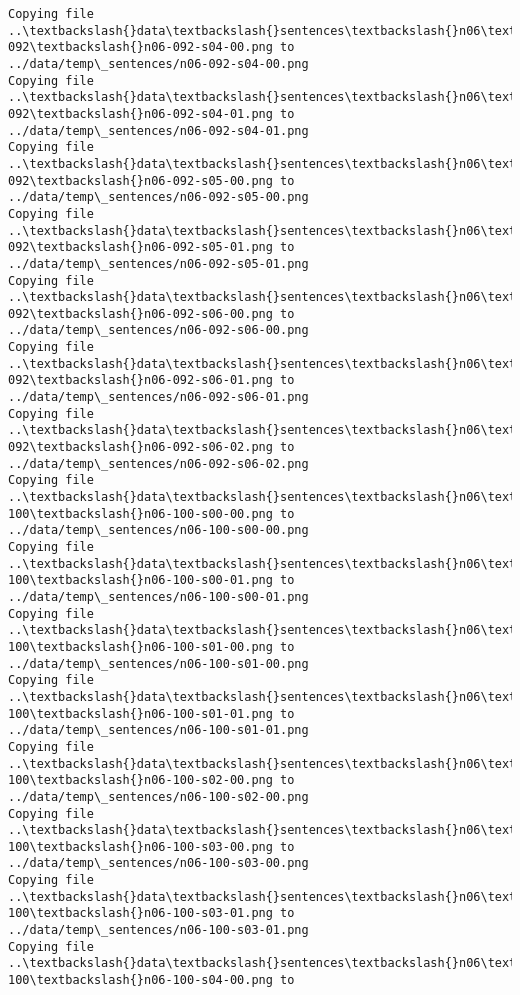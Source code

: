 \documentclass[11pt]{article}
\begin{document}
\begin{Verbatim}[commandchars=\\\{\}]
Copying file ..\textbackslash{}data\textbackslash{}sentences\textbackslash{}n06\textbackslash{}n06-092\textbackslash{}n06-092-s04-00.png to
../data/temp\_sentences/n06-092-s04-00.png
Copying file ..\textbackslash{}data\textbackslash{}sentences\textbackslash{}n06\textbackslash{}n06-092\textbackslash{}n06-092-s04-01.png to
../data/temp\_sentences/n06-092-s04-01.png
Copying file ..\textbackslash{}data\textbackslash{}sentences\textbackslash{}n06\textbackslash{}n06-092\textbackslash{}n06-092-s05-00.png to
../data/temp\_sentences/n06-092-s05-00.png
Copying file ..\textbackslash{}data\textbackslash{}sentences\textbackslash{}n06\textbackslash{}n06-092\textbackslash{}n06-092-s05-01.png to
../data/temp\_sentences/n06-092-s05-01.png
Copying file ..\textbackslash{}data\textbackslash{}sentences\textbackslash{}n06\textbackslash{}n06-092\textbackslash{}n06-092-s06-00.png to
../data/temp\_sentences/n06-092-s06-00.png
Copying file ..\textbackslash{}data\textbackslash{}sentences\textbackslash{}n06\textbackslash{}n06-092\textbackslash{}n06-092-s06-01.png to
../data/temp\_sentences/n06-092-s06-01.png
Copying file ..\textbackslash{}data\textbackslash{}sentences\textbackslash{}n06\textbackslash{}n06-092\textbackslash{}n06-092-s06-02.png to
../data/temp\_sentences/n06-092-s06-02.png
Copying file ..\textbackslash{}data\textbackslash{}sentences\textbackslash{}n06\textbackslash{}n06-100\textbackslash{}n06-100-s00-00.png to
../data/temp\_sentences/n06-100-s00-00.png
Copying file ..\textbackslash{}data\textbackslash{}sentences\textbackslash{}n06\textbackslash{}n06-100\textbackslash{}n06-100-s00-01.png to
../data/temp\_sentences/n06-100-s00-01.png
Copying file ..\textbackslash{}data\textbackslash{}sentences\textbackslash{}n06\textbackslash{}n06-100\textbackslash{}n06-100-s01-00.png to
../data/temp\_sentences/n06-100-s01-00.png
Copying file ..\textbackslash{}data\textbackslash{}sentences\textbackslash{}n06\textbackslash{}n06-100\textbackslash{}n06-100-s01-01.png to
../data/temp\_sentences/n06-100-s01-01.png
Copying file ..\textbackslash{}data\textbackslash{}sentences\textbackslash{}n06\textbackslash{}n06-100\textbackslash{}n06-100-s02-00.png to
../data/temp\_sentences/n06-100-s02-00.png
Copying file ..\textbackslash{}data\textbackslash{}sentences\textbackslash{}n06\textbackslash{}n06-100\textbackslash{}n06-100-s03-00.png to
../data/temp\_sentences/n06-100-s03-00.png
Copying file ..\textbackslash{}data\textbackslash{}sentences\textbackslash{}n06\textbackslash{}n06-100\textbackslash{}n06-100-s03-01.png to
../data/temp\_sentences/n06-100-s03-01.png
Copying file ..\textbackslash{}data\textbackslash{}sentences\textbackslash{}n06\textbackslash{}n06-100\textbackslash{}n06-100-s04-00.png to

\end{Verbatim}
\end{document}
